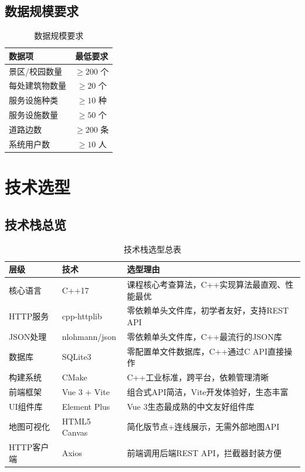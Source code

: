 \documentclass[12pt,a4paper]{report}
\begin{document}
\section{数据规模要求}

\begin{table}[H]
\centering
\caption{数据规模要求}
\begin{tabular}{lc}
\toprule
\textbf{数据项} & \textbf{最低要求} \\
\midrule
景区/校园数量 & $\geq 200$ 个 \\
每处建筑物数量 & $\geq 20$ 个 \\
服务设施种类 & $\geq 10$ 种 \\
服务设施数量 & $\geq 50$ 个 \\
道路边数 & $\geq 200$ 条 \\
系统用户数 & $\geq 10$ 人 \\
\bottomrule
\end{tabular}
\end{table}


\chapter{技术选型}

\section{技术栈总览}

\begin{table}[H]
\centering
\caption{技术栈选型总表}
\begin{tabularx}{\textwidth}{>{\centering}p{2.2cm} X >{\centering}p{4.5cm}}
\toprule
\textbf{层级} & \textbf{技术} & \textbf{选型理由} \\
\midrule
核心语言 & C++17 & 课程核心考查算法，C++实现算法最直观、性能最优 \\
HTTP服务 & cpp-httplib & 零依赖单头文件库，初学者友好，支持REST API \\
JSON处理 & nlohmann/json & 零依赖单头文件库，C++最流行的JSON库 \\
数据库 & SQLite3 & 零配置单文件数据库，C++通过C API直接操作 \\
构建系统 & CMake & C++工业标准，跨平台，依赖管理清晰 \\
前端框架 & Vue 3 + Vite & 组合式API简洁，Vite开发体验好，生态丰富 \\
UI组件库 & Element Plus & Vue 3生态最成熟的中文友好组件库 \\
地图可视化 & HTML5 Canvas & 简化版节点+连线展示，无需外部地图API \\
HTTP客户端 & Axios & 前端调用后端REST API，拦截器封装方便 \\
\bottomrule
\end{tabularx}
\end{table}
\end{document}
